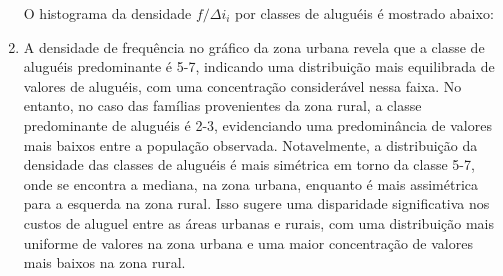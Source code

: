 \documentclass{article}
\begin{document}
\begin{enumerate}[label=(\alph*), start=1]
   O histograma da densidade $f/\Delta i_i$ por classes de aluguéis é mostrado abaixo:
    
    \begin{center}
    \end{center}
    
\item A densidade de frequência no gráfico da zona urbana revela que a classe de aluguéis predominante é 5-7, indicando uma distribuição mais equilibrada de valores de aluguéis, com uma concentração considerável nessa faixa. No entanto, no caso das famílias provenientes da zona rural, a classe predominante de aluguéis é 2-3, evidenciando uma predominância de valores mais baixos entre a população observada. Notavelmente, a distribuição da densidade das classes de aluguéis é mais simétrica em torno da classe 5-7, onde se encontra a mediana, na zona urbana, enquanto é mais assimétrica para a esquerda na zona rural. Isso sugere uma disparidade significativa nos custos de aluguel entre as áreas urbanas e rurais, com uma distribuição mais uniforme de valores na zona urbana e uma maior concentração de valores mais baixos na zona rural.

\end{enumerate}
\end{document}
